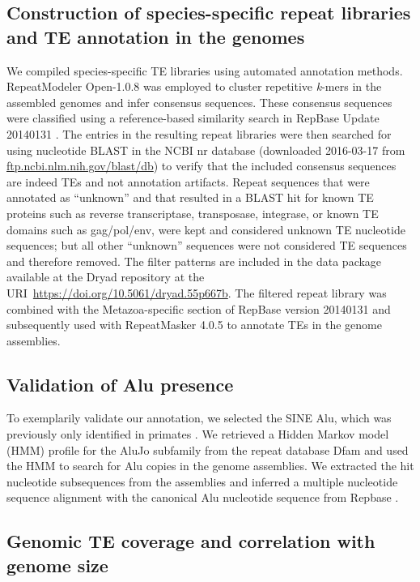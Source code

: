\subsection{Construction of species-specific repeat libraries and TE
annotation in the genomes}

We compiled species-specific TE libraries using automated annotation
methods. RepeatModeler Open-1.0.8 \citep{Smit2015} was employed to
cluster repetitive \emph{k}-mers in the assembled genomes and infer
consensus sequences. These consensus sequences were classified using a
reference-based similarity search in RepBase Update 20140131
\citep{Jurka2005}. The entries in the resulting repeat libraries were
then searched for using nucleotide BLAST in the NCBI nr database
(downloaded 2016-03-17 from
\href{ftp://ftp.ncbi.nlm.nih.gov/blast/db}{ftp.ncbi.nlm.nih.gov/blast/db})
to verify that the included consensus sequences are indeed TEs and not
annotation artifacts. Repeat sequences that were annotated as
``unknown'' and that resulted in a BLAST hit for known TE proteins such
as reverse transcriptase, transposase, integrase, or known TE domains
such as gag/pol/env, were kept and considered unknown TE nucleotide
sequences; but all other ``unknown'' sequences were not considered TE
sequences and therefore removed. The filter patterns are included in the
data package available at the Dryad repository at the
URI~\url{https://doi.org/10.5061/dryad.55p667b}. The filtered repeat
library was combined with the Metazoa-specific section of RepBase
version 20140131 and subsequently used with RepeatMasker 4.0.5
\citep{Smit2015} to annotate TEs in the genome assemblies.

\subsection{Validation of Alu presence}

To exemplarily validate our annotation, we selected the SINE Alu, which
was previously only identified in primates \citep{Kriegs2007}. We
retrieved a Hidden Markov model (HMM) profile for the AluJo subfamily
from the repeat database Dfam \citep{Hubley2015} and used the HMM to
search for Alu copies in the genome assemblies. We extracted the hit
nucleotide subsequences from the assemblies and inferred a multiple
nucleotide sequence alignment with the canonical Alu nucleotide sequence
from Repbase \citep{Jurka2005}.

\subsection{Genomic TE coverage and correlation with genome size}

